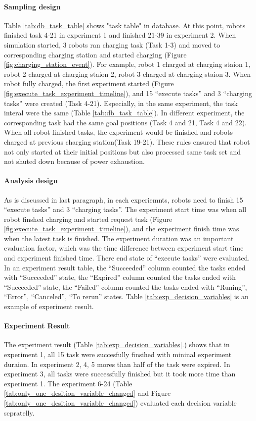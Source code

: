 \paragraph{Sampling design}
Table \ref{tab:db_task_table} shows "task table" in database. At this point, robots finished task 4-21 in experiment 1 and finished 21-39 in experiment 2. When simulation started, 3 robots ran charging task (Task 1-3) and moved to corresponding charging station and started charging (Figure \ref{fig:charging_station_event}). For example, robot 1 charged at charging staion 1, robot 2 charged at charging staion 2, robot 3 charged at charging staion 3. 
When robot fully charged, the first experiment started (Figure \ref{fig:execute_task_experiment_timeline}), and 15 ``execute tasks'' and 3 ``charging tasks'' were created (Task 4-21). Especially, in the same experiment, the task interal were the same (Table \ref{tab:db_task_table}). In different experiment, the corresponding task had the same goal positions (Task 4 and 21, Task 4 and 22). 
When all robot finished tasks, the experiment would be finished and robots charged at previous charging station(Task 19-21).
These rules ensured that robot not only started at their initial positions but also processed same task set and not shuted down because of power exhaustion.

\paragraph{Analysis design}
As is discussed in last paragraph, in each experiemnts, robots need to finish 15 ``execute tasks'' and 3 ``charging tasks''.
The experiment start time was when all robot finshed charging and started request task (Figure \ref{fig:execute_task_experiment_timeline}), and the experiment finish time was when the latest task is finished.
The experiment duration was an important evaluation factor, which was the time difference between experiment start time and experiment finished time.  
There end state of ``execute tasks'' were evaluated. In an experiment result table, the ``Succeeded'' column counted the tasks ended with ``Succeeded'' state, the ``Expired'' column counted the tasks ended with ``Succeeded'' state, the ``Failed'' column counted the tasks ended with ``Runing'', ``Error'', ``Canceled'', ``To rerun'' states. 
Table \ref{tab:exp_decision_variables} is an example of experiment result. 

\paragraph{Experiment Result} 
The experiment result (Table \ref{tab:exp_decision_variables}.) shows that in experiment 1, all 15 task were succesfully finsihed with mininal experiment duraion. In experiment 2, 4, 5 mores than half of the task were expired. In experiment 3, all tasks were successfully finished but it took more time than experiment 1. 
The experiment 6-24 (Table \ref{tab:only_one_desition_variable_changed} and Figure \ref{tab:only_one_desition_variable_changed}) evaluated each decision variable sepratelly. 

